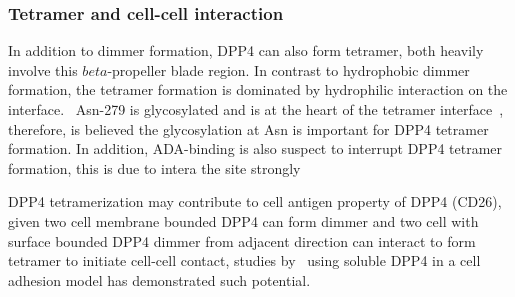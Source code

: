 \subsubsection{Tetramer and cell-cell interaction}

In addition to dimmer formation, DPP4 can also form tetramer, both heavily involve this $beta$-propeller blade region. In contrast to hydrophobic dimmer formation, the tetramer formation is dominated by hydrophilic interaction on the interface.~\cite{Engel_2003} Asn-279 is glycosylated and is at the heart of the tetramer interface~\cite{Engel_2003}, therefore, is believed the glycosylation at Asn is important for DPP4 tetramer formation. In addition, ADA-binding is also suspect to interrupt DPP4 tetramer formation, this is due to intera the  site strongly  
\par 
DPP4 tetramerization may contribute to cell antigen property of DPP4 (CD26), given two cell membrane bounded DPP4 can form dimmer and two cell with surface bounded DPP4 dimmer from adjacent direction can interact to form tetramer to initiate cell-cell contact, studies by~\citet{Cheng1998,Abdel-Ghany1998} using soluble DPP4 in a cell adhesion model has demonstrated such potential. 